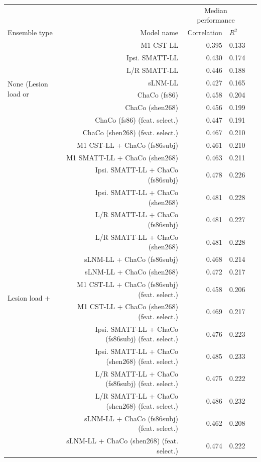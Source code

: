 \documentclass[10pt]{article}
\def\Plus{\texttt{+}}
\begin{document}
\begin{table}[h]
\centering
\label{table:5}
\begin{tabular}{lrrll}
\toprule
 &  & \multicolumn{2}{c}{Median performance} \\
Ensemble type & Model name & Correlation & $R^2$  \\
\midrule
\multirow[t]{8}{*}{None (Lesion load or} & M1 CST-LL & 0.395 & 0.133 \\
 ChaCo only)& Ipsi. SMATT-LL & 0.430 & 0.174 \\
 & L/R SMATT-LL & 0.446 & 0.188 \\
 & sLNM-LL & 0.427 & 0.165 \\
 & ChaCo (fs86) & 0.458 & 0.204 \\
 & ChaCo (shen268) & 0.456 & 0.199 \\
 & ChaCo (fs86) (feat. select.) & 0.447 & 0.191 \\
 & ChaCo (shen268) (feat. select.) & 0.467 & 0.210 \\
\multirow[t]{16}{*}{Lesion load $\Plus$} & M1 CST-LL + ChaCo (fs86subj) & 0.461 & 0.210 \\
 ChaCo & M1 SMATT-LL + ChaCo (shen268) & 0.463 & 0.211 \\
 & Ipsi. SMATT-LL + ChaCo (fs86subj) & 0.478 & 0.226 \\
 & Ipsi. SMATT-LL + ChaCo (shen268) & 0.481 & 0.228 \\
 & L/R SMATT-LL + ChaCo (fs86subj) & 0.481 & 0.227 \\
 & L/R SMATT-LL + ChaCo (shen268) & 0.481 & 0.228 \\
 & sLNM-LL + ChaCo (fs86subj) & 0.468 & 0.214 \\
 & sLNM-LL + ChaCo (shen268) & 0.472 & 0.217 \\
 & M1 CST-LL + ChaCo (fs86subj) (feat. select.) & 0.458 & 0.206 \\
 & M1 CST-LL + ChaCo (shen268) (feat. select.) & 0.469 & 0.217 \\
 & Ipsi. SMATT-LL + ChaCo (fs86subj) (feat. select.) & 0.476 & 0.223 \\
 & Ipsi. SMATT-LL + ChaCo (shen268) (feat. select.) & 0.485 & 0.233 \\
 & L/R SMATT-LL + ChaCo (fs86subj) (feat. select.) & 0.475 & 0.222 \\
 & L/R SMATT-LL + ChaCo (shen268) (feat. select.) & 0.486 & 0.232 \\
 & sLNM-LL + ChaCo (fs86subj) (feat. select.) & 0.462 & 0.208 \\
 & sLNM-LL + ChaCo (shen268) (feat. select.) & 0.474 & 0.222 \\

\end{tabular}
\end{table}
\end{document}

